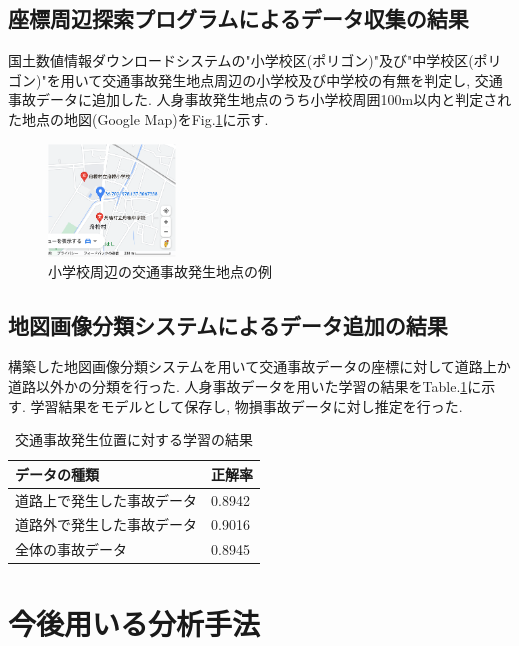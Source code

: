 \documentclass[a4j,8.5pt, twocolumn,fleqn]{jbook}
\begin{document}
\subsection{座標周辺探索プログラムによるデータ収集の結果}
国土数値情報ダウンロードシステムの"小学校区(ポリゴン)"及び"中学校区(ポリゴン)"を用いて交通事故発生地点周辺の小学校及び中学校の有無を判定し, 交通事故データに追加した. 
人身事故発生地点のうち小学校周囲100m以内と判定された地点の地図(Google Map)をFig.\ref{shougakkou_gmap}に示す. 

\begin{figure}[htb]
    \centering
    \includegraphics[height=30mm]{images/shougakkou_gmap.png}
    \vspace{-3mm}
    \caption{小学校周辺の交通事故発生地点の例}
    \label{shougakkou_gmap}
\end{figure}

\subsection{地図画像分類システムによるデータ追加の結果}
構築した地図画像分類システムを用いて交通事故データの座標に対して道路上か道路以外かの分類を行った. 
人身事故データを用いた学習の結果をTable.\ref{table_road}に示す. 
学習結果をモデルとして保存し, 物損事故データに対し推定を行った. 


\begin{table}[htb]
    \centering
    \caption{交通事故発生位置に対する学習の結果}
    \label{table_road}
    \begin{tabular}{|l|l|}
        \hline
        \textbf{データの種類} & \textbf{正解率} \\ \hline
        道路上で発生した事故データ   & 0.8942       \\ \hline
        道路外で発生した事故データ   & 0.9016       \\ \hline
        全体の事故データ        & 0.8945       \\ \hline
    \end{tabular}
\end{table}



\section{今後用いる分析手法}
\end{document}
